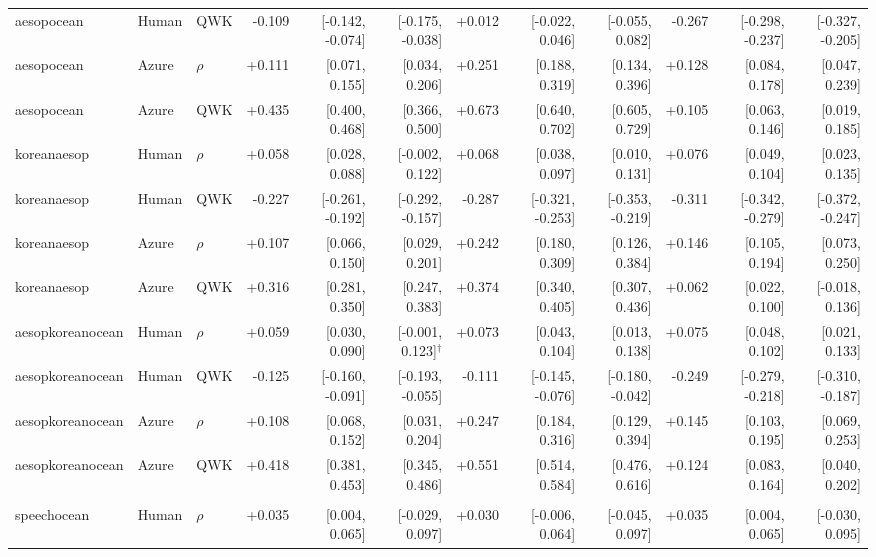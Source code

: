 \documentclass[10pt]{article}
\begin{document}
\begin{landscape}
\begin{longtable}{@{}lllrrrrrrrrr@{}}
aesopocean & Human & QWK & -0.109 & [-0.142, -0.074] & [-0.175, -0.038] & +0.012 & [-0.022, 0.046] & [-0.055, 0.082] & -0.267 & [-0.298, -0.237] & [-0.327, -0.205]\\
aesopocean & Azure & $\rho$ & +0.111 & [0.071, 0.155] & [0.034, 0.206] & +0.251 & [0.188, 0.319] & [0.134, 0.396] & +0.128 & [0.084, 0.178] & [0.047, 0.239]\\
aesopocean & Azure & QWK & +0.435 & [0.400, 0.468] & [0.366, 0.500] & +0.673 & [0.640, 0.702] & [0.605, 0.729] & +0.105 & [0.063, 0.146] & [0.019, 0.185]\\
\addlinespace[2pt]
koreanaesop & Human & $\rho$ & +0.058 & [0.028, 0.088] & [-0.002, 0.122] & +0.068 & [0.038, 0.097] & [0.010, 0.131] & +0.076 & [0.049, 0.104] & [0.023, 0.135]\\
koreanaesop & Human & QWK & -0.227 & [-0.261, -0.192] & [-0.292, -0.157] & -0.287 & [-0.321, -0.253] & [-0.353, -0.219] & -0.311 & [-0.342, -0.279] & [-0.372, -0.247]\\
koreanaesop & Azure & $\rho$ & +0.107 & [0.066, 0.150] & [0.029, 0.201] & +0.242 & [0.180, 0.309] & [0.126, 0.384] & +0.146 & [0.105, 0.194] & [0.073, 0.250]\\
koreanaesop & Azure & QWK & +0.316 & [0.281, 0.350] & [0.247, 0.383] & +0.374 & [0.340, 0.405] & [0.307, 0.436] & +0.062 & [0.022, 0.100] & [-0.018, 0.136]\\
\addlinespace[2pt]
aesopkoreanocean & Human & $\rho$ & +0.059 & [0.030, 0.090] & [-0.001, 0.123]$^{\dagger}$ & +0.073 & [0.043, 0.104] & [0.013, 0.138] & +0.075 & [0.048, 0.102] & [0.021, 0.133]\\
aesopkoreanocean & Human & QWK & -0.125 & [-0.160, -0.091] & [-0.193, -0.055] & -0.111 & [-0.145, -0.076] & [-0.180, -0.042] & -0.249 & [-0.279, -0.218] & [-0.310, -0.187]\\
aesopkoreanocean & Azure & $\rho$ & +0.108 & [0.068, 0.152] & [0.031, 0.204] & +0.247 & [0.184, 0.316] & [0.129, 0.394] & +0.145 & [0.103, 0.195] & [0.069, 0.253]\\
aesopkoreanocean & Azure & QWK & +0.418 & [0.381, 0.453] & [0.345, 0.486] & +0.551 & [0.514, 0.584] & [0.476, 0.616] & +0.124 & [0.083, 0.164] & [0.040, 0.202]\\
\addlinespace[2pt]
\midrule\multicolumn{12}{l}{\textbf{3RB-A: three-ratio banded, pronunciation-accuracy error}}\\*
speechocean & Human & $\rho$ & +0.035 & [0.004, 0.065] & [-0.029, 0.097] & +0.030 & [-0.006, 0.064] & [-0.045, 0.097] & +0.035 & [0.004, 0.065] & [-0.030, 0.095]\\

\end{longtable}
\end{landscape}
\end{document}

